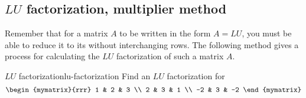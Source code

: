 \subsection{$LU$ factorization, multiplier method}

Remember that for a matrix $A$ to be written in the form $A=LU$, you must be able to reduce it to its {\ef} without interchanging rows. The following method gives a process for calculating the $LU$ factorization of such a matrix $A$. 

\begin{example}{$LU$ factorization}{lu-factorization}
Find an $LU$ factorization for 
\begin{equation*}
\begin{mymatrix}{rrr}
1 & 2 & 3 \\ 
2 & 3 & 1 \\ 
-2 & 3 & -2
\end{mymatrix}
\end{equation*}
\end{example}

